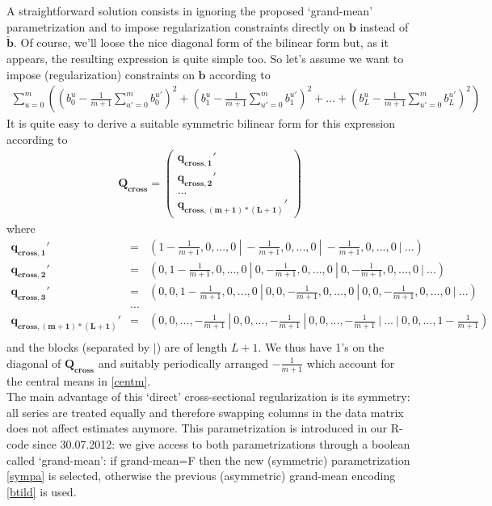 \documentclass[11pt]{article}
\begin{document}
A straightforward solution consists in ignoring the proposed `grand-mean' parametrization and to impose regularization constraints directly on $\mathbf{b}$ instead of $\mathbf{\tilde{b}}$. Of course, we'll loose the nice diagonal form of the bilinear form but, as it appears, the resulting expression is quite simple too. So let's assume we want to impose (regularization) constraints on $\mathbf{b}$ according to
\begin{eqnarray}\label{centm}
\sum_{u=0}^m\left(\left(b_0^u-\frac{1}{m+1}\sum_{u'=0}^mb_0^{u'}\right)^2+\left(b_1^u-\frac{1}{m+1}\sum_{u'=0}^mb_1^{u'}\right)^2+...+\left(b_L^u-\frac{1}{m+1}\sum_{u'=0}^mb_L^{u'}\right)^2\right)
\end{eqnarray}
It is quite easy to derive a suitable symmetric bilinear form for this expression according to
\begin{eqnarray}\label{sympa}
\mathbf{{Q}_{cross}}=\left(\begin{array}{c}\mathbf{q_{cross,1}}'\\
\mathbf{q_{cross,2}}'\\...\\
\mathbf{q_{cross,(m+1)*(L+1)}}'\end{array}\right)
\end{eqnarray} 
where 
\begin{eqnarray*}
\mathbf{q_{cross,1}}'&=&(1-\frac{1}{m+1},0,...,0~|~-\frac{1}{m+1},0,...,0~|~-\frac{1}{m+1},0,...,0~|~...)\\
\mathbf{q_{cross,2}}'&=&(0,1-\frac{1}{m+1},0,...,0~|~0,-\frac{1}{m+1},0,...,0~|~0,-\frac{1}{m+1},0,...,0~|~...)\\
\mathbf{q_{cross,3}}'&=&(0,0,1-\frac{1}{m+1},0,...,0~|~0,0,-\frac{1}{m+1},0,...,0~|~0,0,-\frac{1}{m+1},0,...,0~|~...)\\
&...&\\
\mathbf{q_{cross,(m+1)*(L+1)}}'&=&(0,0,...,-\frac{1}{m+1}~|~0,0,...,-\frac{1}{m+1}~|~0,0,...,-\frac{1}{m+1}~|~...~|~0,0,...,1-\frac{1}{m+1})\\
\end{eqnarray*}
and the blocks (separated by $|$) are of length $L+1$. We thus have 1's on the diagonal of $\mathbf{{Q}_{cross}}$ and suitably periodically arranged $-\frac{1}{m+1}$ which account for the central means in \ref{centm}. \\

The main advantage of this `direct' cross-sectional regularization is its symmetry: all series are treated equally and therefore swapping columns in the data matrix does not affect estimates anymore. This parametrization is introduced in our R-code since 30.07.2012: we give access to both parametrizations through a boolean  called `grand-mean': if grand-mean=F then the new (symmetric) parametrization \ref{sympa} is selected, otherwise the previous (asymmetric) grand-mean encoding \ref{btild} is used.\\
\end{document}
